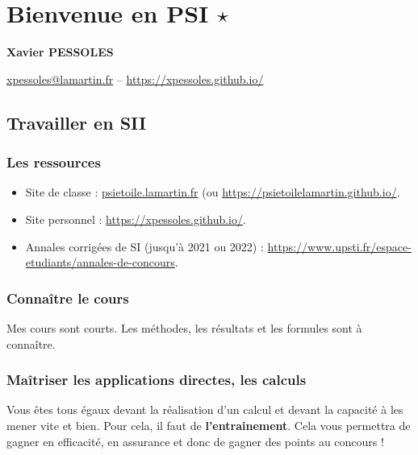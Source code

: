 \renewcommand{\repExo}{\repRel/PSI_Cy_01_ModelisationSystemes/Ch_02_RevisionsSLCI/}
\renewcommand{\nomExo}{01_Modelisation_Perf_Fiche}
\graphicspath{{\repStyle/png}{\repExo\nomExo/images}}
%


\setchapterpreamble[u]{\margintoc}

\chapter*{Bienvenue en PSI $\star$}
\setcounter{chapter}{1}

\begin{center}
\Large
\textsf{\textbf{Xavier PESSOLES}}
\normalsize 

\vspace{.5cm} 

\url{xpessoles@lamartin.fr} -- \url{https://xpessoles.github.io/}
\normalsize
\end{center}
\section{Travailler en SII}
\subsection{Les ressources}
\begin{itemize}
\item Site de classe : \url{psietoile.lamartin.fr} (ou \url{https://psietoilelamartin.github.io/}.
\item Site personnel : \url{https://xpessoles.github.io/}.
\item Annales corrigées de SI (jusqu'à 2021 ou 2022) : \url{https://www.upsti.fr/espace-etudiants/annales-de-concours}. 

\end{itemize}
\subsection{Connaître le cours}
Mes cours sont courts. Les méthodes, les résultats et les formules sont à connaître. 

\subsection{Maîtriser les applications directes, les calculs}
Vous êtes tous égaux devant la réalisation d'un calcul et devant la capacité à les mener vite et bien. 
Pour cela, il faut de \textbf{l'entrainement}. Cela vous permettra de gagner en efficacité, en assurance et donc de gagner des points au concours !


